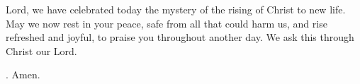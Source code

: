 \lettrine[lines=2]{L}{}ord,
we have celebrated today
the mystery of the rising of Christ to new life.
May we now rest in your peace,
safe from all that could harm us,
and rise refreshed and joyful,
to praise you throughout another day.
We ask this through Christ our Lord.
\par \Rbar. Amen.

